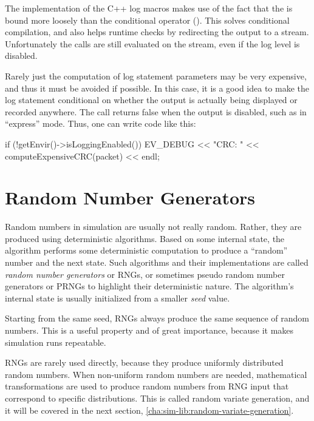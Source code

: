 The implementation of the C++ log macros makes use of the fact that the
 is bound more loosely than the conditional operator
(). This solves conditional compilation, and also helps runtime
checks by redirecting the output to a  stream. Unfortunately the
 calls are still evaluated on the  stream, even if
the log level is disabled.

Rarely just the computation of log statement parameters may be very expensive,
and thus it must be avoided if possible. In this case, it is a good idea to
make the log statement conditional on whether the output is actually being
displayed or recorded anywhere. The  call
returns false when the output is disabled, such as in ``express'' mode. Thus,
one can write code like this:

\begin{cpp}
if (!getEnvir()->isLoggingEnabled())
    EV_DEBUG << "CRC: " << computeExpensiveCRC(packet) << endl;
\end{cpp}




\section{Random Number Generators}
\label{cha:sim-lib:random-number-generators}

Random numbers in simulation are usually not really random. Rather, they
are produced using deterministic algorithms. Based on some internal state,
the algorithm performs some deterministic computation to produce a
``random'' number and the next state. Such algorithms and their
implementations are called \textit{random number generators} or RNGs, or
sometimes pseudo random number generators or PRNGs to highlight their
deterministic nature. The algorithm's internal state is usually initialized
from a smaller \textit{seed} value.

Starting from the same seed, RNGs always produce the same sequence of
random numbers. This is a useful property and of great importance, because
it makes simulation runs repeatable.

RNGs are rarely used directly, because they produce uniformly distributed
random numbers. When non-uniform random numbers are needed, mathematical
transformations are used to produce random numbers from RNG input that
correspond to specific distributions. This is called random variate
generation, and it will be covered in the next section,
\ref{cha:sim-lib:random-variate-generation}.

